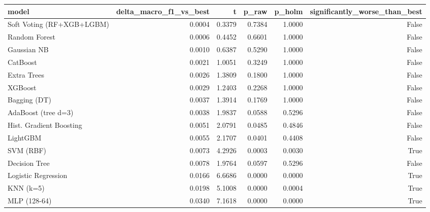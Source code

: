 \begin{tabular}{lrrrrr}
\toprule
model & delta_macro_f1_vs_best & t & p_raw & p_holm & significantly_worse_than_best \\
\midrule
Soft Voting (RF+XGB+LGBM) & 0.0004 & 0.3379 & 0.7384 & 1.0000 & False \\
Random Forest & 0.0006 & 0.4452 & 0.6601 & 1.0000 & False \\
Gaussian NB & 0.0010 & 0.6387 & 0.5290 & 1.0000 & False \\
CatBoost & 0.0021 & 1.0051 & 0.3249 & 1.0000 & False \\
Extra Trees & 0.0026 & 1.3809 & 0.1800 & 1.0000 & False \\
XGBoost & 0.0029 & 1.2403 & 0.2268 & 1.0000 & False \\
Bagging (DT) & 0.0037 & 1.3914 & 0.1769 & 1.0000 & False \\
AdaBoost (tree d=3) & 0.0038 & 1.9837 & 0.0588 & 0.5296 & False \\
Hist. Gradient Boosting & 0.0051 & 2.0791 & 0.0485 & 0.4846 & False \\
LightGBM & 0.0055 & 2.1707 & 0.0401 & 0.4408 & False \\
SVM (RBF) & 0.0073 & 4.2926 & 0.0003 & 0.0030 & True \\
Decision Tree & 0.0078 & 1.9764 & 0.0597 & 0.5296 & False \\
Logistic Regression & 0.0166 & 6.6686 & 0.0000 & 0.0000 & True \\
KNN (k=5) & 0.0198 & 5.1008 & 0.0000 & 0.0004 & True \\
MLP (128-64) & 0.0340 & 7.1618 & 0.0000 & 0.0000 & True \\
\bottomrule
\end{tabular}
